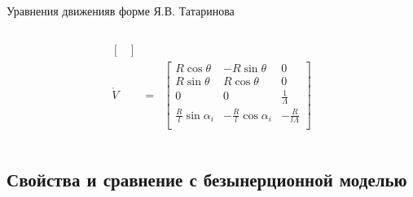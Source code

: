 \documentclass{beamer}
\begin{document}
\begin{frame}{Уравнения движения}{в форме Я.В. Татаринова}
\begin{columns}
\begin{column}{0.6\textwidth}
\begin{eqnarray*}
\begin{bmatrix}
                    \end{bmatrix} \\
                \mathring{V} & = &
                    \begin{bmatrix}
                        R\cos\theta & -R\sin\theta & 0 \\
                        R\sin\theta & R\cos\theta  & 0 \\
                        0           & 0            & \frac{1}{\Lambda} \\
                        \frac{R}{l}\sin\alpha_i & -\frac{R}{l}\cos\alpha_i & -\frac{R}{l\Lambda} \\
                    \end{bmatrix}
            \end{eqnarray*}
        \end{column}
    \end{columns}
\end{frame}

\subsection{Свойства и сравнение с безынерционной моделью}
\end{document}
